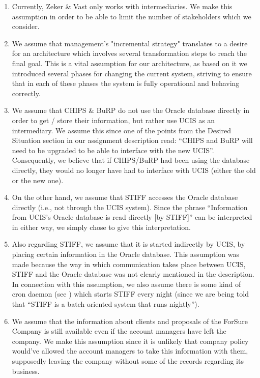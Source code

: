 \begin{enumerate}

\item Currently, Zeker \& Vast only works with intermediaries. We make this assumption
in order to be able to limit the number of stakeholders which we consider.

\item We assume that management's "incremental strategy" translates to a desire
for an architecture which involves several transformation steps to reach the final goal.
This is a vital assumption for our architecture, as based on it we introduced several
phases for changing the current system, striving to ensure that in each of these
phases the system is fully operational and behaving correctly.

\item We assume that CHIPS \& BuRP do not use the Oracle database directly in order
to get / store their information, but rather use UCIS as an intermediary. We assume
this since one of the points from the Desired Situation section in our assignment description
read: ``CHIPS and BuRP will need to be upgraded to be able to interface with the new
UCIS''. Consequently, we believe that if CHIPS/BuRP had been using the database directly,
they would no longer have had to interface with UCIS (either the old or the new one).

\item On the other hand, we assume that STIFF accesses the Oracle database directly
(i.e., not through the UCIS system). Since the phrase ``Information from UCIS's Oracle
database is read directly [by STIFF]'' can be interpreted in either way, we simply chose to
give this interpretation.

\item Also regarding STIFF, we assume that it is started indirectly by UCIS, by placing
certain information in the Oracle database. This assumption was made because the
way in which communication takes place between UCIS, STIFF and the Oracle database
was not clearly mentioned in the description. In connection with this assumption, we
also assume there is some kind of cron daemon (see \cite{cron}) which starts STIFF
every night (since we are being told that ``STIFF is a batch-oriented system that runs
nightly'').

\item We assume that the information about clients and proposals of the ForSure
Company is still available even if the account managers have left the company. We
make this assumption since it is unlikely that company policy would've allowed
the account managers to take this information with them, supposedly leaving the
company without some of the records regarding its business.


\end{enumerate}
